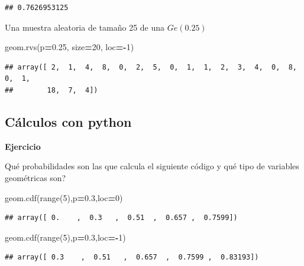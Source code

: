 \documentclass[]{book}
\newenvironment{Shaded}{\begin{snugshade}}{\end{snugshade}}
\newcommand{\BuiltInTok}[1]{#1}
\newcommand{\DecValTok}[1]{\textcolor[rgb]{0.00,0.00,0.81}{#1}}
\newcommand{\FloatTok}[1]{\textcolor[rgb]{0.00,0.00,0.81}{#1}}
\newcommand{\NormalTok}[1]{#1}
\newcommand{\OperatorTok}[1]{\textcolor[rgb]{0.81,0.36,0.00}{\textbf{#1}}}
\begin{document}
\begin{verbatim}
## 0.7626953125
\end{verbatim}

Una muestra aleatoria de tamaño 25 de una \(Ge(0.25)\)

\begin{Shaded}
\begin{Highlighting}[]
\NormalTok{geom.rvs(p}\OperatorTok{=}\FloatTok{0.25}\NormalTok{, size}\OperatorTok{=}\DecValTok{20}\NormalTok{, loc}\OperatorTok{=-}\DecValTok{1}\NormalTok{)}
\end{Highlighting}
\end{Shaded}

\begin{verbatim}
## array([ 2,  1,  4,  8,  0,  2,  5,  0,  1,  1,  2,  3,  4,  0,  8,  0,  1,
##        18,  7,  4])
\end{verbatim}

\hypertarget{cuxe1lculos-con-python-4}{%
\subsection{Cálculos con python}\label{cuxe1lculos-con-python-4}}

\textbf{Ejercicio}

Qué probabilidades son las que calcula el siguiente código y qué tipo de variables geométricas son?

\begin{Shaded}
\begin{Highlighting}[]
\NormalTok{geom.cdf(}\BuiltInTok{range}\NormalTok{(}\DecValTok{5}\NormalTok{),p}\OperatorTok{=}\FloatTok{0.3}\NormalTok{,loc}\OperatorTok{=}\DecValTok{0}\NormalTok{)}
\end{Highlighting}
\end{Shaded}

\begin{verbatim}
## array([ 0.    ,  0.3   ,  0.51  ,  0.657 ,  0.7599])
\end{verbatim}

\begin{Shaded}
\begin{Highlighting}[]
\NormalTok{geom.cdf(}\BuiltInTok{range}\NormalTok{(}\DecValTok{5}\NormalTok{),p}\OperatorTok{=}\FloatTok{0.3}\NormalTok{,loc}\OperatorTok{=-}\DecValTok{1}\NormalTok{)}
\end{Highlighting}
\end{Shaded}

\begin{verbatim}
## array([ 0.3    ,  0.51   ,  0.657  ,  0.7599 ,  0.83193])
\end{verbatim}
\end{document}
